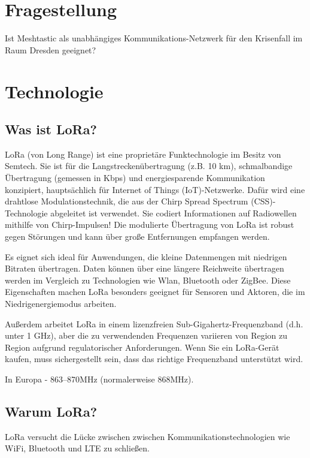 \documentclass[12pt,a4paper]{article}
\begin{document}
\section{Fragestellung}

Ist Meshtastic als unabhängiges Kommunikations-Netzwerk für den Krisenfall im Raum Dresden geeignet?

\section{Technologie}
\subsection{Was ist LoRa?}

LoRa (von Long Range) ist eine proprietäre Funktechnologie im Besitz von Semtech. Sie ist für die Langstreckenübertragung (z.B. 10 km), schmalbandige Übertragung (gemessen in Kbps) und energiesparende Kommunikation konzipiert, hauptsächlich für Internet of Things (IoT)-Netzwerke. Dafür wird eine drahtlose Modulationstechnik, die aus der Chirp Spread Spectrum (CSS)-Technologie abgeleitet ist verwendet. Sie codiert Informationen auf Radiowellen mithilfe von Chirp-Impulsen! Die modulierte Übertragung von LoRa ist robust gegen Störungen und kann über große Entfernungen empfangen werden.

Es eignet sich ideal für Anwendungen, die kleine Datenmengen mit niedrigen Bitraten übertragen. Daten können über eine längere Reichweite übertragen werden im Vergleich zu Technologien wie Wlan, Bluetooth oder ZigBee. Diese Eigenschaften machen LoRa besonders geeignet für Sensoren und Aktoren, die im Niedrigenergiemodus arbeiten.

Außerdem arbeitet LoRa in einem lizenzfreien Sub-Gigahertz-Frequenzband (d.h. unter 1 GHz), aber die zu verwendenden Frequenzen variieren von Region zu Region aufgrund regulatorischer Anforderungen. Wenn Sie ein LoRa-Gerät kaufen, muss sichergestellt sein, dass das richtige Frequenzband unterstützt wird.

In Europa - 863–870MHz (normalerweise 868MHz).

\subsection{Warum LoRa?}

LoRa versucht die Lücke zwischen zwischen Kommunikationstechnologien wie WiFi, Bluetooth und LTE zu schließen.\\
\end{document}
